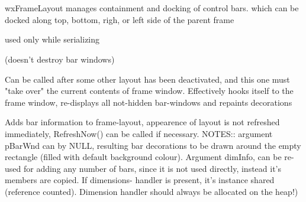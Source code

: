 %
%


\section{}\label{wxframelayout}


wxFrameLayout manages containment and docking of control bars.
   which can be docked along top, bottom, righ, or left side of the
   parent frame
 





\label{wxframelayoutwxframelayout}




used only while serializing


\label{wxframelayoutdtor}


(doesn't destroy bar windows)


\label{wxframelayoutactivate}


Can be called after some other layout has been deactivated,
and this one must "take over" the current contents of frame window.
Effectively hooks itself to the frame window, re-displays all not-hidden
bar-windows and repaints decorations


\label{wxframelayoutaddbar}


Adds bar information to frame-layout, appearence of layout is not refreshed
immediately, RefreshNow() can be called if necessary.
NOTES:: argument pBarWnd can by NULL, resulting bar decorations to be drawn
around the empty rectangle (filled with default background colour).
Argument dimInfo, can be re-used for adding any number of bars, since
it is not used directly, instead it's members are copied. If dimensions-
handler is present, it's instance shared (reference counted). Dimension
handler should always be allocated on the heap!)



